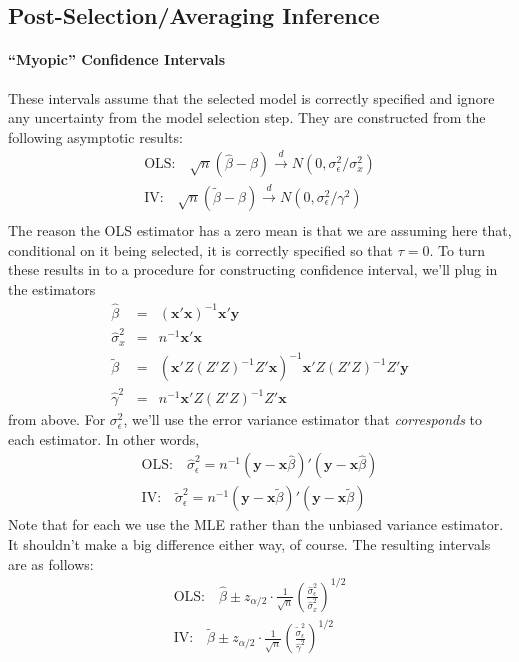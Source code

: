 \documentclass[12pt]{article}
\theoremstyle{definition}
\begin{document}
\subsection{Post-Selection/Averaging Inference} %
\label{sub:valid_confidence_interval_for_ols_vs_2sls_example}

\paragraph{``Myopic'' Confidence Intervals}
These intervals assume that the selected model is correctly specified and ignore any uncertainty from the model selection step. They are constructed from the following asymptotic results:
  \begin{eqnarray*}
    \mbox{OLS:} \quad \sqrt{n}(\widehat{\beta} - \beta) \overset{d}{\rightarrow} N(0, \sigma_\epsilon^2/\sigma_x^2)\\
    \mbox{IV:} \quad \sqrt{n}(\widetilde{\beta} - \beta) \overset{d}{\rightarrow} N(0, \sigma_\epsilon^2/\gamma^2)\\
  \end{eqnarray*}
The reason the OLS estimator has a zero mean is that we are assuming here that, conditional on it being selected, it is correctly specified so that $\tau = 0$. To turn these results in to a procedure for constructing confidence interval, we'll plug in the estimators
 \begin{eqnarray*}
    \widehat{\beta} &=& (\mathbf{x}'\mathbf{x})^{-1}\mathbf{x}'\mathbf{y}\\
    \widehat{\sigma}_x^2 &=& n^{-1}\mathbf{x}'\mathbf{x} \\
    \widetilde{\beta} &=& (\mathbf{x}'Z(Z'Z)^{-1} Z'\mathbf{x})^{-1}\mathbf{x}'Z (Z'Z)^{-1} Z'\mathbf{y}\\
    \widehat{\gamma}^2 &=& n^{-1} \mathbf{x}'Z(Z'Z)^{-1}Z'\mathbf{x}
  \end{eqnarray*}
from above. For $\sigma_\epsilon^2$, we'll use the error variance estimator that \emph{corresponds} to each estimator. In other words, 
  \begin{eqnarray*}
    \mbox{OLS:} \quad \widehat{\sigma}_\epsilon^2 = n^{-1} \left(\mathbf{y} - \mathbf{x}\widehat{\beta}\right)'\left(\mathbf{y} - \mathbf{x}\widehat{\beta}\right)\\
    \mbox{IV:} \quad \widetilde{\sigma}_\epsilon^2 = n^{-1} \left(\mathbf{y} - \mathbf{x}\widetilde{\beta}\right)'\left(\mathbf{y} - \mathbf{x}\widetilde{\beta}\right)
  \end{eqnarray*}
Note that for each we use the MLE rather than the unbiased variance estimator. It shouldn't make a big difference either way, of course. The resulting intervals are as follows:
  \begin{eqnarray*}
    \mbox{OLS:} \quad \widehat{\beta} \pm z_{\alpha/2} \cdot \frac{1}{\sqrt{n}} \left(\frac{\widehat{\sigma}_\epsilon^2}{\widehat{\sigma}_x^2} \right)^{1/2}\\
    \mbox{IV:} \quad \widetilde{\beta} \pm z_{\alpha/2} \cdot \frac{1}{\sqrt{n}} \left(\frac{\widetilde{\sigma}_\epsilon^2}{\widehat{\gamma}^2} \right)^{1/2}
  \end{eqnarray*}
\end{document}
